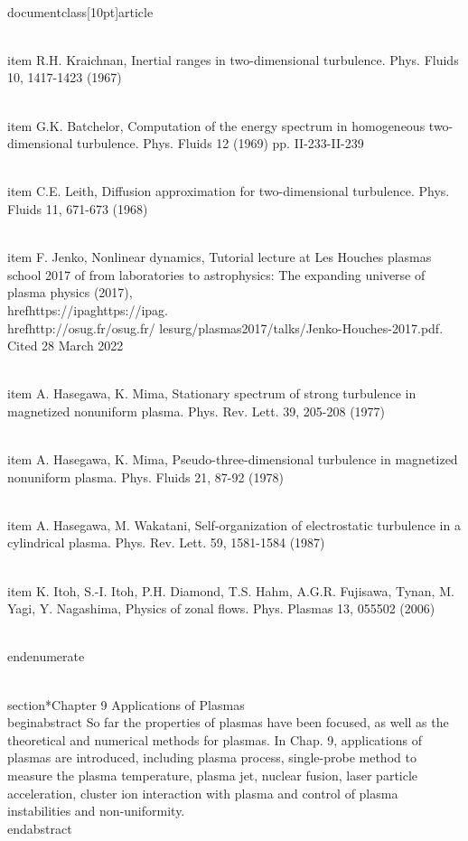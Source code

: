 \\documentclass[10pt]{article}
\begin{document}
{{{{{  \\item R.H. Kraichnan, Inertial ranges in two-dimensional turbulence. Phys. Fluids 10, 1417-1423 (1967)

  \\item G.K. Batchelor, Computation of the energy spectrum in homogeneous two-dimensional turbulence. Phys. Fluids 12 (1969) pp. II-233-II-239

  \\item C.E. Leith, Diffusion approximation for two-dimensional turbulence. Phys. Fluids 11, 671-673 (1968)

  \\item F. Jenko, Nonlinear dynamics, Tutorial lecture at Les Houches plasmas school 2017 of from laboratories to astrophysics: The expanding universe of plasma physics (2017), \\href{https://ipag}{https://ipag}. \\href{http://osug.fr/}{osug.fr/} lesurg/plasmas2017/talks/Jenko-Houches-2017.pdf. Cited 28 March 2022

  \\item A. Hasegawa, K. Mima, Stationary spectrum of strong turbulence in magnetized nonuniform plasma. Phys. Rev. Lett. 39, 205-208 (1977)

  \\item A. Hasegawa, K. Mima, Pseudo-three-dimensional turbulence in magnetized nonuniform plasma. Phys. Fluids 21, 87-92 (1978)

  \\item A. Hasegawa, M. Wakatani, Self-organization of electrostatic turbulence in a cylindrical plasma. Phys. Rev. Lett. 59, 1581-1584 (1987)

  \\item K. Itoh, S.-I. Itoh, P.H. Diamond, T.S. Hahm, A.G.R. Fujisawa, Tynan, M. Yagi, Y. Nagashima, Physics of zonal flows. Phys. Plasmas 13, 055502 (2006)

\\end{enumerate}

\\section*{Chapter 9 Applications of Plasmas }
\\begin{abstract}
So far the properties of plasmas have been focused, as well as the theoretical and numerical methods for plasmas. In Chap. 9, applications of plasmas are introduced, including plasma process, single-probe method to measure the plasma temperature, plasma jet, nuclear fusion, laser particle acceleration, cluster ion interaction with plasma and control of plasma instabilities and non-uniformity.
\\end{abstract}

}}}}}
\end{document}
